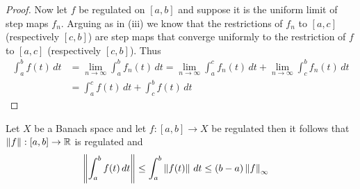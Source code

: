 \begin{proof}
  Now let $f$ be regulated on $[a,b]$ and suppose it is the uniform limit of step maps $f_n$. Arguing as in (iii) we know that the restrictions of $f_n$ to $[a,c]$ (respectively $[c,b]$) are step maps that converge uniformly to the restriction of $f$ to $[a,c]$ (respectively $[c,b]$).   Thus
  \begin{align*}
    \int_a^b f(t) \, dt &= \lim_{n \to \infty} \int_a^b f_n(t) \, dt = \lim_{n \to \infty} \int_a^c f_n(t) \, dt + \lim_{n \to \infty} \int_c^b f_n(t) \, dt \\
    &= \int_a^c f(t) \, dt  + \int_c^b f(t) \, dt 
  \end{align*}
\end{proof}


\begin{prop}\label{NormRiemannIntegralBanachSpace}Let $X$ be a
  Banach space and let $f : [a,b] \to X$ be regulated then it
  follows that $\left \lVert f \right \rVert : [a,b] \to \mathbb{R}$ is regulated and 
\begin{align*} 
\left \lVert \int_a^b f(t) \, dt \right \rVert &\leq \int_a^b \left \lVert f(t) \right \rVert \, dt  \leq (b - a) \left \lVert f \right \rVert_\infty
\end{align*}
\end{prop}
